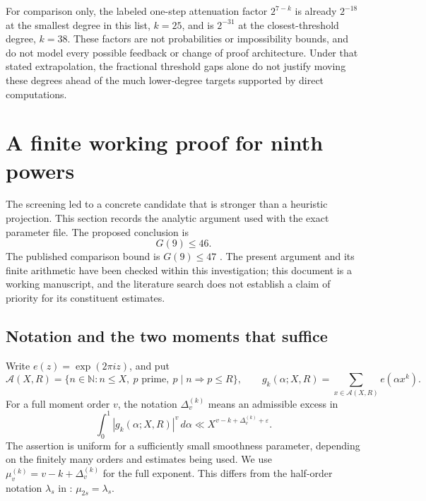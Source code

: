 \documentclass[11pt,letterpaper]{article}
\numberwithin{equation}{section}
\begin{document}
For comparison only, the labeled one-step attenuation factor $2^{7-k}$
is already $2^{-18}$ at the smallest degree in this list, $k=25$, and is
$2^{-31}$ at the closest-threshold degree, $k=38$.  These factors are not
probabilities or impossibility bounds, and do not model every possible
feedback or change of proof architecture.  Under that stated extrapolation,
the fractional threshold gaps alone do not justify moving these degrees
ahead of the much lower-degree targets supported by direct computations.

\par\bigskip{}

\section{A finite working proof for ninth powers}
\label{sec:proof}

The screening led to a concrete candidate that is stronger than a heuristic
projection.  This section records the analytic argument used with the exact
parameter file.  The proposed conclusion is
\[
                         G(9)\le 46.
\]
The published comparison bound is $G(9)\le47$ \cite{W16}.  The present
argument and its finite arithmetic have been checked within this investigation;
this document is a working manuscript, and the literature search does not
establish a claim of priority for its constituent estimates.

\subsection{Notation and the two moments that suffice}

Write $e(z)=\exp(2\pi iz)$, and put
\[
 \mathcal A(X,R)=\{n\in\mathbb N:n\le X,\ p\text{ prime},\ p\mid n
                                      \Longrightarrow p\le R\},\qquad
 g_k(\alpha;X,R)=\sum_{x\in\mathcal A(X,R)}e(\alpha x^k).
\]
For a full moment order $v$, the notation $\Delta_v^{(k)}$ means an
admissible excess in
\begin{equation}
 \int_0^1|g_k(\alpha;X,R)|^v\,d\alpha
       \ll X^{v-k+\Delta_v^{(k)}+\varepsilon}.
 \label{eq:admissible}
\end{equation}
The assertion is uniform for a sufficiently small smoothness parameter,
depending on the finitely many orders and estimates being used.  We use
$\mu_v^{(k)}=v-k+\Delta_v^{(k)}$ for the full exponent.  This differs from
the half-order notation $\lambda_s$ in \cite{VW00}: $\mu_{2s}=\lambda_s$.
\end{document}
